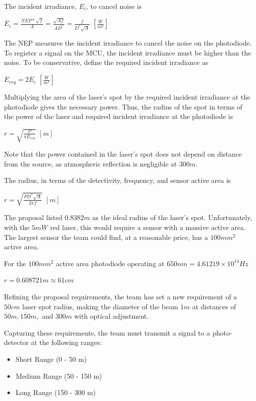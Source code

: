 \documentclass[letterpaper,10pt]{article}
\begin{document}
\begin{spacing}{1.15}
The incident irradiance, $E_i$, to cancel noise is
\begin{center}
	{\large $E_i = \frac{NEP * \sqrt{f}}{A} = \frac{\sqrt{Af}}{AD^*} = \frac{f}{D^*\sqrt{A}}$} $[\frac{W}{m^{2}}]$
\end{center}

The NEP measures the incident irradiance to cancel the noise on the photodiode. To register a signal on the MCU, the incident irradiance must be higher than the noise. To be conservative, define the required incident irradiance as 
\begin{center}
	{\large $E_{req} = 2E_i$} $[\frac{W}{m^{2}}]$
\end{center}

Multiplying the area of the laser's spot by the required incident irradiance at the photodiode gives the necessary power. Thus, the radius of the spot in terms of the power of the laser and required incident irradiance at the photodiode is 
\begin{center}
	{\large $r = \sqrt{\frac{P}{\pi E_{req}}}$} $[m]$
\end{center}

Note that the power contained in the laser's spot does not depend on distance from the source, as atmospheric reflection is negligible at $300 m$.

The radius, in terms of the detectivity, frequency, and sensor active area is
\begin{center}
	{\large $r = \sqrt{\frac{PD^*\sqrt{A}}{2 \pi f}}$} $[m]$
\end{center}

The proposal listed $0.8382 m$ as the ideal radius of the laser's spot. Unfortunately, with the $5mW$ red laser, this would require a sensor with a massive active area. The largest sensor the team could find, at a reasonable price, has a $100 mm^2$ active area. 

For the $100 mm^2$ active area photodiode operating at $650 nm = 4.61219 × 10^{14} Hz$ 
\begin{center}
	$r = 0.608721 m \approx 61 cm$
\end{center}

Refining the proposal requirements, the team has set a new requirement of a $50 cm$ laser spot radius, making the diameter of the beam $1m$ at distances of $50m, 150m,$ and $300m$ with optical adjustment. 

Capturing these requirements, the team must transmit a signal to a photo-detector at the following ranges:
\begin{itemize}
	\item Short Range (0 - 50 m)
	\item Medium Range (50 - 150 m)
	\item Long Range (150 - 300 m)
\end{itemize}


\end{spacing}
\end{document}
